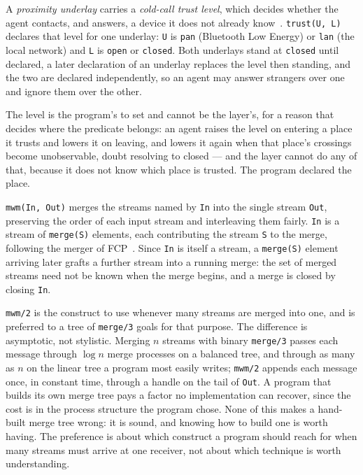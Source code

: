 A \emph{proximity underlay} carries a \emph{cold-call trust level}, which decides whether the agent contacts, and answers, a device it does not already know~\cite{bachar2026networking}. \verb|trust(U, L)| declares that level for one underlay: \verb|U| is \verb|pan| (Bluetooth Low Energy) or \verb|lan| (the local network) and \verb|L| is \verb|open| or \verb|closed|. Both underlays stand at \verb|closed| until declared, a later declaration of an underlay replaces the level then standing, and the two are declared independently, so an agent may answer strangers over one and ignore them over the other.

The level is the program's to set and cannot be the layer's, for a reason that decides where the predicate belongs: an agent raises the level on entering a place it trusts and lowers it on leaving, and lowers it again when that place's crossings become unobservable, doubt resolving to closed --- and the layer cannot do any of that, because it does not know which place is trusted. The program declared the place.

\verb|mwm(In, Out)| merges the streams named by \verb|In| into the single stream \verb|Out|, preserving the order of each input stream and interleaving them fairly. \verb|In| is a stream of \verb|merge(S)| elements, each contributing the stream \verb|S| to the merge, following the merger of FCP~\cite{shapiro1989family}. Since \verb|In| is itself a stream, a \verb|merge(S)| element arriving later grafts a further stream into a running merge: the set of merged streams need not be known when the merge begins, and a merge is closed by closing \verb|In|.

\verb|mwm/2| is the construct to use whenever many streams are merged into one, and is preferred to a tree of \verb|merge/3| goals for that purpose. The difference is asymptotic, not stylistic. Merging $n$ streams with binary \verb|merge/3| passes each message through $\log n$ merge processes on a balanced tree, and through as many as $n$ on the linear tree a program most easily writes; \verb|mwm/2| appends each message once, in constant time, through a handle on the tail of \verb|Out|. A program that builds its own merge tree pays a factor no implementation can recover, since the cost is in the process structure the program chose. None of this makes a hand-built merge tree wrong: it is sound, and knowing how to build one is worth having. The preference is about which construct a program should reach for when many streams must arrive at one receiver, not about which technique is worth understanding.

